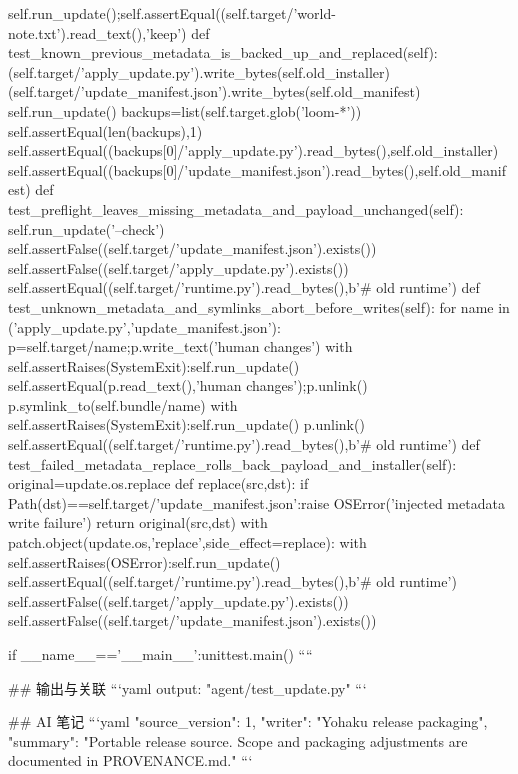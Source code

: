         self.run_update();self.assertEqual((self.target/'world-note.txt').read_text(),'keep')
    def test_known_previous_metadata_is_backed_up_and_replaced(self):
        (self.target/'apply_update.py').write_bytes(self.old_installer)
        (self.target/'update_manifest.json').write_bytes(self.old_manifest)
        self.run_update()
        backups=list(self.target.glob('loom-*'))
        self.assertEqual(len(backups),1)
        self.assertEqual((backups[0]/'apply_update.py').read_bytes(),self.old_installer)
        self.assertEqual((backups[0]/'update_manifest.json').read_bytes(),self.old_manifest)
    def test_preflight_leaves_missing_metadata_and_payload_unchanged(self):
        self.run_update('--check')
        self.assertFalse((self.target/'update_manifest.json').exists())
        self.assertFalse((self.target/'apply_update.py').exists())
        self.assertEqual((self.target/'runtime.py').read_bytes(),b'# old runtime\n')
    def test_unknown_metadata_and_symlinks_abort_before_writes(self):
        for name in ('apply_update.py','update_manifest.json'):
            p=self.target/name;p.write_text('human changes')
            with self.assertRaises(SystemExit):self.run_update()
            self.assertEqual(p.read_text(),'human changes');p.unlink()
            p.symlink_to(self.bundle/name)
            with self.assertRaises(SystemExit):self.run_update()
            p.unlink()
        self.assertEqual((self.target/'runtime.py').read_bytes(),b'# old runtime\n')
    def test_failed_metadata_replace_rolls_back_payload_and_installer(self):
        original=update.os.replace
        def replace(src,dst):
            if Path(dst)==self.target/'update_manifest.json':raise OSError('injected metadata write failure')
            return original(src,dst)
        with patch.object(update.os,'replace',side_effect=replace):
            with self.assertRaises(OSError):self.run_update()
        self.assertEqual((self.target/'runtime.py').read_bytes(),b'# old runtime\n')
        self.assertFalse((self.target/'apply_update.py').exists())
        self.assertFalse((self.target/'update_manifest.json').exists())

if __name__=='__main__':unittest.main()
````

## 输出与关联
```yaml
output: "agent/test_update.py"
```

## AI 笔记
```yaml
{"source_version": 1, "writer": "Yohaku release packaging", "summary": "Portable release source. Scope and packaging adjustments are documented in PROVENANCE.md."}
```
